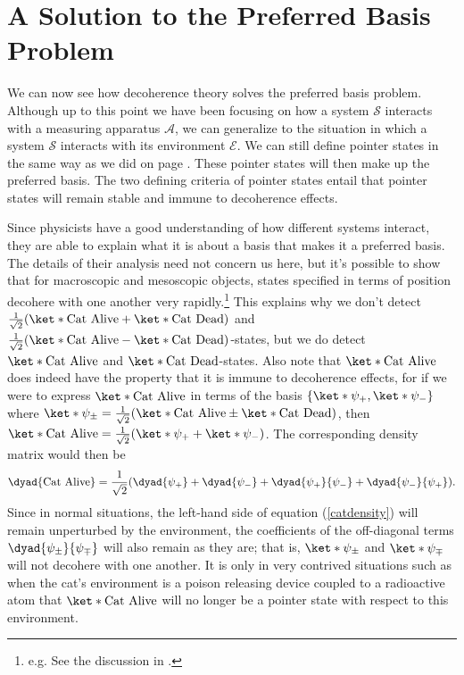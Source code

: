 \documentclass[12pt]{report}
\begin{document}


\section{\label{sectionPreferredBasis}A Solution to the Preferred Basis Problem\protect\footnotemark}
We can now see how decoherence theory solves the preferred basis problem. Although up to this point we have been focusing on how a system $\mathcal{S}$ interacts with a measuring apparatus $\mathcal{A}$, we can generalize to the situation in which a system $\mathcal{S}$ interacts with its environment $\mathcal{E}$. We can still define pointer states in the same way as we did on page \pageref{pointer}. These pointer states will then make up the preferred basis. The two defining criteria of pointer states entail that pointer states will remain stable and immune to decoherence effects. 

Since physicists have a good understanding of how different systems interact, they are able to explain what it is about a basis that makes it a preferred basis.  The details of their analysis need not concern us here, but it's possible to show that for macroscopic and mesoscopic objects, states specified in terms of position decohere with one another very rapidly.\footnote{e.g. See the discussion in \cite[94]{Schlosshauer}.} This explains why we don't detect $\frac{1}{\sqrt{2}}(\ket*{\text{Cat Alive}}+\ket*{\text{Cat Dead}})$ and $\frac{1}{\sqrt{2}}(\ket*{\text{Cat Alive}}-\ket*{\text{Cat Dead}})$-states, but we do detect $\ket*{\text{Cat Alive}}$ and $\ket*{\text{Cat Dead}}$-states. Also note that $\ket*{\text{Cat Alive}}$  does indeed have the property that it is immune to decoherence effects, for if we were to express $\ket*{\text{Cat Alive}}$ in terms of the basis $\{\ket*{\psi_+},\ket*{\psi_-} \}$ where $\ket*{\psi_\pm}=\frac{1}{\sqrt{2}}(\ket*{\text{Cat Alive}}\pm\ket*{\text{Cat Dead}})$, then $\ket*{\text{Cat Alive}}=\frac{1}{\sqrt{2}}(\ket*{\psi_+}+\ket*{\psi_-})$. The corresponding density matrix would then be 
\begin{equation}\label{catdensity}\dyad{\text{Cat Alive}}=\frac{1}{\sqrt{2}}(\dyad{\psi_+}+\dyad{\psi_-}+\dyad{\psi_+}{\psi_-}+\dyad{\psi_-}{\psi_+}). 
\end{equation} Since in normal situations, the left-hand side of equation (\ref{catdensity}) will remain unperturbed by the environment, the coefficients of the off-diagonal terms $\dyad{\psi_\pm}{\psi_\mp}$ will also remain as they are; that is, $\ket*{\psi_\pm}$ and $\ket*{\psi_\mp}$ will not decohere with one another. It is only in very contrived situations such as when the cat's environment is a poison releasing device coupled to a radioactive atom that $\ket*{\text{Cat Alive}}$ will no longer be a pointer state with respect to this environment.
\end{document}
